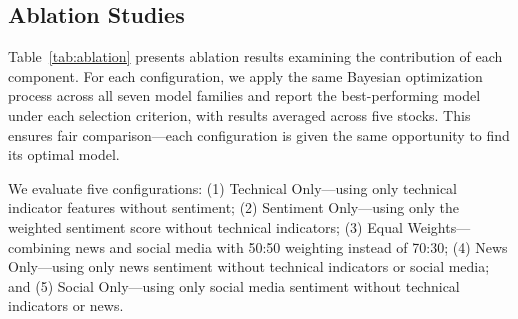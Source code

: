 \documentclass[a4paper,10pt,conference]{IEEEtran}
\begin{document}

\subsection{Ablation Studies}

Table~\ref{tab:ablation} presents ablation results examining the contribution of each component. For each configuration, we apply the same Bayesian optimization process across all seven model families and report the best-performing model under each selection criterion, with results averaged across five stocks. This ensures fair comparison---each configuration is given the same opportunity to find its optimal model.

We evaluate five configurations: (1) Technical Only---using only technical indicator features without sentiment; (2) Sentiment Only---using only the weighted sentiment score without technical indicators; (3) Equal Weights---combining news and social media with 50:50 weighting instead of 70:30; (4) News Only---using only news sentiment without technical indicators or social media; and (5) Social Only---using only social media sentiment without technical indicators or news.
\end{document}
